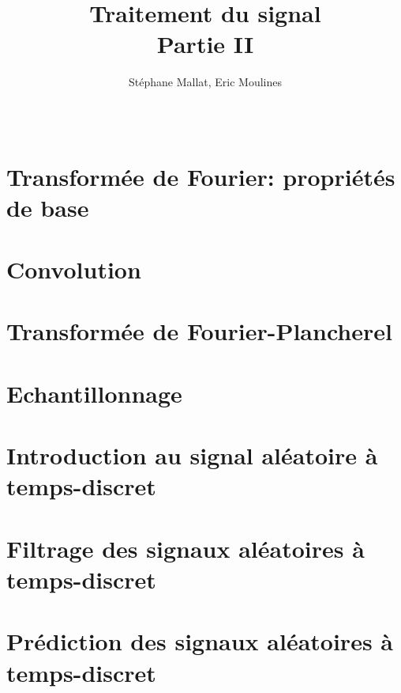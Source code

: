 \documentclass[graybox,francais,envcountchap,envcountsame,sectrefs]{svmono}
\title{Traitement du signal\\
Partie II}
\author{St\'ephane Mallat, Eric Moulines}
\date{\ }
\theoremstyle{exercise}
\begin{document}
\maketitle
\tableofcontents

\chapter{Transform{\'e}e de Fourier: propri{\'e}t{\'e}s de base}


\chapter{Convolution}

\chapter{Transform{\'e}e de Fourier-Plancherel}

\chapter{Echantillonnage}


\chapter{Introduction au signal al\'eatoire \`a temps-discret}


\chapter{Filtrage des signaux al\'eatoires \`a temps-discret}

\chapter{Pr\'ediction des signaux al\'eatoires \`a temps-discret}

%

%



\end{document}
